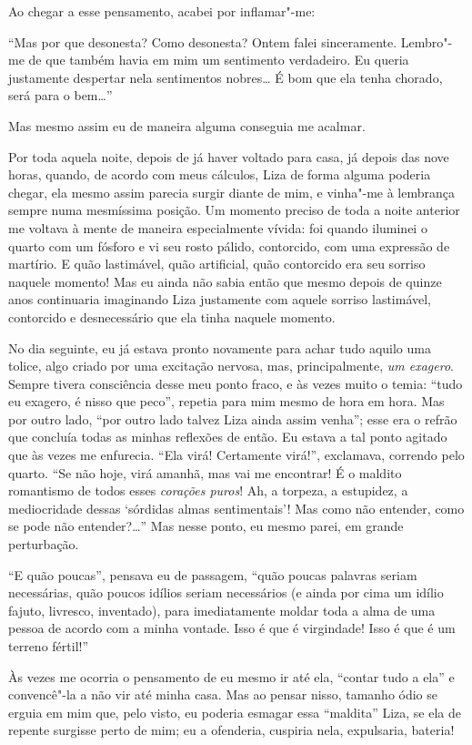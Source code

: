Ao chegar a esse pensamento, acabei por inflamar"-me:

“Mas por que desonesta? Como desonesta? Ontem falei sinceramente.
Lembro"-me de que também havia em mim um sentimento verdadeiro. Eu
queria justamente despertar nela sentimentos nobres\ldots{} É bom que ela
tenha chorado, será para o bem\ldots{}”

Mas mesmo assim eu de maneira alguma conseguia me acalmar.

Por toda aquela noite, depois de já haver voltado para casa, já depois
das nove horas, quando, de acordo com meus cálculos, Liza de forma
alguma poderia chegar, ela mesmo assim parecia surgir diante de mim, e
vinha"-me à lembrança sempre numa mesmíssima posição. Um momento preciso
de toda a noite anterior me voltava à mente de maneira especialmente
vívida: foi quando iluminei o quarto com um fósforo e vi seu rosto
pálido, contorcido, com uma expressão de martírio. E quão lastimável,
quão artificial, quão contorcido era seu sorriso naquele momento! Mas
eu ainda não sabia então que mesmo depois de quinze anos continuaria
imaginando Liza justamente com aquele sorriso lastimável, contorcido e
desnecessário que ela tinha naquele momento.

No dia seguinte, eu já estava pronto novamente para achar tudo aquilo
uma tolice, algo criado por uma excitação nervosa, mas, principalmente,
\textit{um exagero}. Sempre tivera consciência desse
meu ponto fraco, e às vezes muito o temia: “tudo eu exagero, é nisso
que peco”, repetia para mim mesmo de hora em hora. Mas por outro lado,
“por outro lado talvez Liza ainda assim venha”; esse era o refrão que
concluía todas as minhas reflexões de então. Eu estava a tal ponto
agitado que às vezes me enfurecia. “Ela virá! Certamente virá!”,
exclamava, correndo pelo quarto. “Se não hoje, virá amanhã, mas vai me
encontrar! É o maldito romantismo de todos esses
\textit{corações puros}! Ah, a torpeza, a estupidez,
a mediocridade dessas ‘sórdidas almas sentimentais’! Mas como não
entender, como se pode não entender?\ldots{}” Mas nesse ponto, eu mesmo
parei, em grande perturbação.

“E quão poucas”, pensava eu de passagem, “quão poucas palavras seriam
necessárias, quão poucos idílios seriam necessários (e ainda por cima
um idílio fajuto, livresco, inventado), para imediatamente moldar toda
a alma de uma pessoa de acordo com a minha vontade. Isso é que é
virgindade! Isso é que é um terreno fértil!”

Às vezes me ocorria o pensamento de eu mesmo ir até ela, “contar tudo a
ela” e convencê"-la a não vir até minha casa. Mas ao pensar nisso,
tamanho ódio se erguia em mim que, pelo visto, eu poderia esmagar essa
“maldita” Liza, se ela de repente surgisse perto de mim; eu a
ofenderia, cuspiria nela, expulsaria, bateria!

